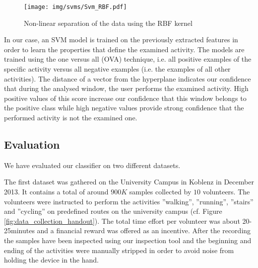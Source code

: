 \begin{figure}[h]
\centering
  \texttt{[image: img/svms/Svm\_RBF.pdf]}
  \caption{Non-linear separation of the data using the RBF kernel}
  \label{fig:svm_rbf}
\end{figure}


In our case, an SVM model is trained on the previously extracted
features in order to learn the properties that define the examined
activity. The models are trained using the one versus all (OVA)
technique, i.e. all positive examples of the specific activity versus
all negative examples (i.e. the examples of all other activities). The
distance of a vector from the hyperplane indicates our confidence that
during the analysed window, the user performs the examined
activity. High positive values of this score increase our confidence
that this window belongs to the positive class while high negative
values provide strong confidence that the performed activity is not
the examined one.


\subsection{Evaluation}\label{sec:har_eval}

We have evaluated our classifier on two different datasets.

The first dataset was gathered on the University Campus in Koblenz in
December 2013.  It contains a total of around $900K$ samples collected
by $10$ volunteers.  The volunteers were instructed to perform the
activities ''walking'', ''running'', ''stairs'' and ''cycling'' on
predefined routes on the university campus (cf. Figure
\ref{fig:data_collection_handout}). The total time effort per
volunteer was about 20-25minutes and a financial reward was offered as
an incentive. After the recording the samples have been inspected
using our inspection tool and the beginning and ending of the
activities were manually stripped in order to avoid noise from holding
the device in the hand.

%
%

